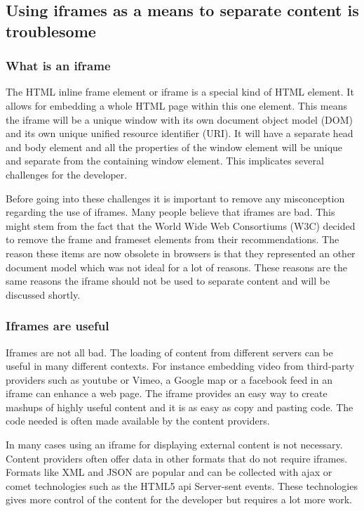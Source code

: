 \documentclass[english]{ifimaster}
\begin{document}
\subsection{Using iframes as a means to separate content is troublesome}
\label{sec:iframes}
\subsubsection{What is an iframe}
The HTML inline frame element or iframe is a special kind of HTML element. It allows for embedding a whole HTML page within this one element. This means the iframe will be a unique window with its own document object model (DOM) and its own unique unified resource identifier (URI). It will have a separate head and body element and all the properties of the window element will be unique and separate from the containing window element. This implicates several challenges for the developer. 

Before going into these challenges it is important to remove any misconception regarding the use of iframes. Many people believe that iframes are bad. This might stem from the fact that the World Wide Web Consortiums (W3C) decided to remove the frame and frameset elements from their recommendations. The reason these items are now obsolete in browsers is that they represented an other document model which was not ideal for a lot of reasons. These reasons are the same reasons the iframe should not be used to separate content and will be discussed shortly.

\subsubsection{Iframes are useful}
Iframes are not all bad. The loading of content from different servers can be useful in many different contexts. For instance embedding video from third-party providers such as youtube or Vimeo, a Google map or a facebook feed in an iframe can enhance a web page. The iframe provides an easy way to create mashups of highly useful content and it is as easy as copy and pasting code. The code needed is often made available by the content providers. 

In many cases using an iframe for displaying external content is not necessary. Content providers often offer data in other formats that do not require iframes. Formats like XML and JSON are popular and can be collected with ajax or comet technologies such as the HTML5 api Server-sent events. These technologies gives more control of the content for the developer but requires a lot more work.
\end{document}
